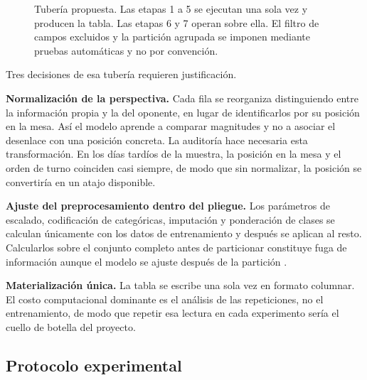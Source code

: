 \begin{figure}[!t]

\caption{Tubería propuesta. Las etapas 1 a 5 se ejecutan una sola vez y
producen la tabla. Las etapas 6 y 7 operan sobre ella. El filtro de campos
excluidos y la partición agrupada se imponen mediante pruebas automáticas y
no por convención.}

\label{fig:pipeline}

\end{figure}

Tres decisiones de esa tubería requieren justificación.

\noindent\textbf{Normalización de la perspectiva.} Cada fila se reorganiza
distinguiendo entre la información propia y la del oponente, en lugar de
identificarlos por su posición en la mesa. Así el modelo aprende a comparar
magnitudes y no a asociar el desenlace con una posición concreta. La
auditoría hace necesaria esta transformación. En los días tardíos de la
muestra, la posición en la mesa y el orden de turno coinciden casi siempre,
de modo que sin normalizar, la posición se convertiría en un atajo
disponible.

\noindent\textbf{Ajuste del preprocesamiento dentro del pliegue.} Los
parámetros de escalado, codificación de categóricas, imputación y
ponderación de clases se calculan únicamente con los datos de entrenamiento
y después se aplican al resto. Calcularlos sobre el conjunto completo antes
de particionar constituye fuga de información aunque el modelo se ajuste
después de la partición \cite{sasse_leakage_2025}.

\noindent\textbf{Materialización única.} La tabla se escribe una sola vez en
formato columnar. El costo computacional dominante es el análisis de las
repeticiones, no el entrenamiento, de modo que repetir esa lectura en cada
experimento sería el cuello de botella del proyecto.

\subsection{Protocolo experimental}
\label{subsec:protocolo}

